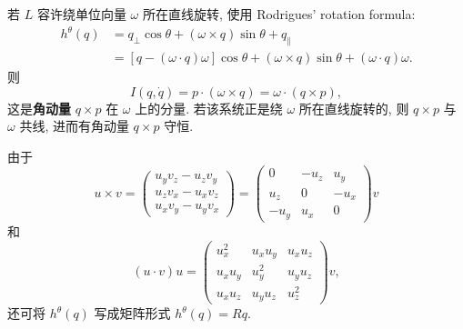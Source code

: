 \begin{example}[角动量守恒]
    若 $ L $ 容许绕单位向量 $ \omega $ 所在直线旋转, 使用 Rodrigues' rotation formula:
    \begin{align*}
        h^\theta(q) &= q_{\perp}\cos\theta+(\omega\times q)\sin\theta+q_{\parallel}\\ 
        &=[q-(\omega\cdot q)\omega]\cos\theta+(\omega\times q)\sin\theta+(\omega\cdot q)\omega.
    \end{align*}
    则
    \[ I(q,\dot{q})=p\cdot(\omega\times q)=\omega\cdot(q\times p), \]
    这是{\bf 角动量} $ q\times p $ 在 $ \omega $ 上的分量. 若该系统正是绕 $ \omega $ 所在直线旋转的, 则 $ q\times p $ 与 $ \omega $ 共线, 进而有角动量 $ q\times p $ 守恒.
\end{example}
\begin{remark}
    由于
    \[ u\times v=\left( \begin{matrix}
        u_yv_z-u_zv_y \\ u_zv_x-u_xv_z \\ u_xv_y-u_yv_x
    \end{matrix} \right)=\left( \begin{matrix}
        0 & -u_z & u_y \\ 
        u_z & 0 & -u_x \\ 
        -u_y & u_x & 0
    \end{matrix} \right)v \]
    和
    \[ (u\cdot v)u=\left( \begin{matrix}
        u_x^2 & u_xu_y & u_xu_z \\ 
        u_xu_y & u_y^2 & u_yu_z \\ 
        u_xu_z & u_yu_z & u_z^2
    \end{matrix} \right)v, \]
    还可将 $ h^\theta(q) $ 写成矩阵形式 $ h^\theta(q)=Rq $.
\end{remark}